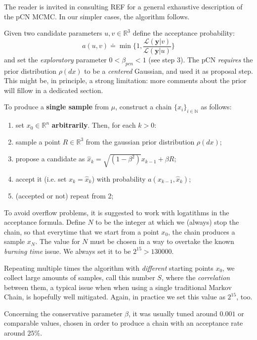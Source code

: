 \documentclass[8pt]{article}
\begin{document}
The reader is invited in consulting REF for a general exhaustive description
of the pCN MCMC. In our simpler cases, the algorithm follows.


Given two candidate parameters $u, v \in \mathbb{R}^3$
define the acceptance probability:
\begin{equation}
	a(u, v) \doteq \min \{ 1, \frac{ \mathcal{L}(\textbf{y} | v )}
				{\mathcal{L}(\textbf{y} | u)} \}
\end{equation}
and set the \emph{exploratory} parameter $0 < \beta_{pcn} < 1$
(see step 3).
The pCN \emph{requires} the prior distribution $\rho(dx)$
to be a \emph{centered} Gaussian, and used it as proposal step.
This might be, in principle, a strong limitation: more comments about the
prior will fillow in a dedicated section.


To produce a \textbf{single sample} from $\mu$, construct a chain 
$\{ x_i \} _{i \in \mathbb{N} }$ as follows:

\begin{enumerate}
	\item set $x_0 \in \mathbb{R}^n$ \textbf{arbitrarily}. Then, for each
		$k > 0$:
	\item sample a point $R \in \mathbb{R}^3$ 
		from the gaussian prior distribution $\rho(dx)$;

	\item  propose a candidate as 
		$
		\hat{x}_{k} = \sqrt{(1 - \beta^2)} x_{k-1}
			+ \beta R
		$;
	\item	accept it (i.e. set $x_{k} = \hat{x}_{k}$)
		with probability $a(x_{k-1}, \hat{x}_k)$;
	\item (accepted or not) repeat from 2;
\end{enumerate}

To avoid overflow problems, it is suggested to work with
logatithms in the acceptance formula. Define
$N$ to be the integer at which we (always) stop the chain,
so that everytime that we start from a point $x_0$,
the chain produces a sample
$x_N$. The value for $N$ must
be chosen in a way to overtake the known \emph{burning time} issue.
We always set it to be $2^15 > 130000$.


Repeating multiple times the algorithm with \emph{different} starting points
$x_0$,
we collect large amounts of samples, call this number $S$,
where the \emph{correlation} between them, a typical issue when
when using a single traditional Markov Chain,
is hopefully well mitigated. Again, in practice we set this value
as $2^15$, too.


Concerning the conservative parameter $\beta$, it was usually tuned around
$0.001$ or comparable values, chosen in order to produce a chain with
an acceptance rate around $25\%$.
\end{document}
